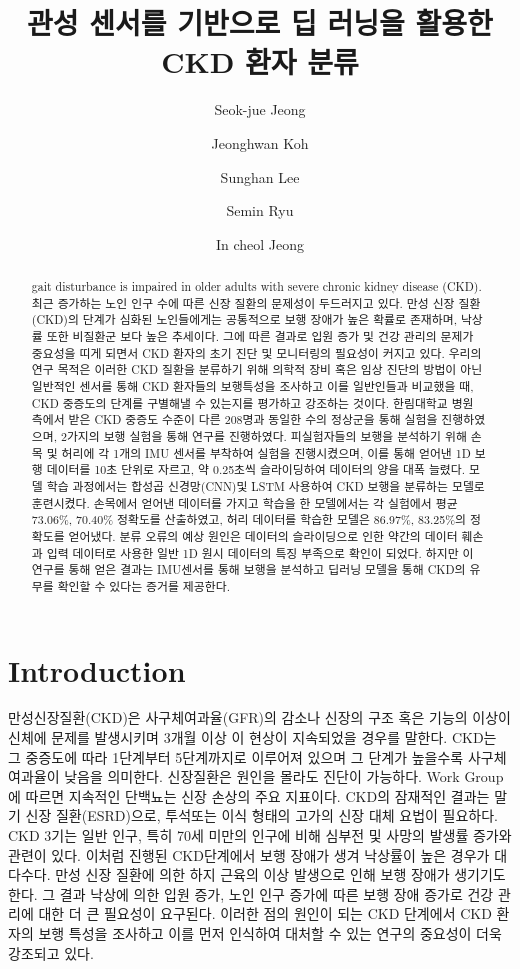 \documentclass{article}
\title{관성 센서를 기반으로 딥 러닝을 활용한 CKD 환자 분류}
\author[1,2]{Seok-jue Jeong}
\author[1,2]{Jeonghwan Koh}
\author[2]{Sunghan Lee}
\author[1,2]{Semin Ryu}
\author[1,2]{In cheol Jeong}
\affil[1]{Department of Artificial Intelligence Conversions, Hallym University, Chuncheon, Gangwon, Republic of Korea}
\affil[2]{Cerebrovascular Disease Research Center, Hallym University, Chuncheon, Gangwon, Republic of Korea}
\begin{document}
\maketitle

\begin{abstract}


gait disturbance is impaired in older adults with severe chronic kidney disease (CKD).
최근 증가하는 노인 인구 수에 따른 신장 질환의 문제성이 두드러지고 있다.
만성 신장 질환(CKD)의 단계가 심화된 노인들에게는 공통적으로 보행 장애가
높은 확률로 존재하며, 낙상률 또한 비질환군 보다 높은 추세이다. 그에 따른
결과로 입원 증가 및 건강 관리의 문제가 중요성을 띠게 되면서 CKD 환자의
초기 진단 및 모니터링의 필요성이 커지고 있다. 우리의 연구 목적은 이러한
CKD 질환을 분류하기 위해 의학적 장비 혹은 임상 진단의 방법이 아닌
일반적인 센서를 통해 CKD 환자들의 보행특성을 조사하고 이를 일반인들과
비교했을 때, CKD 중증도의 단계를 구별해낼 수 있는지를 평가하고 강조하는
것이다. 한림대학교 병원 측에서 받은 CKD 중증도 수준이 다른 208명과
동일한 수의 정상군을 통해 실험을 진행하였으며, 2가지의 보행 실험을 통해
연구를 진행하였다. 피실험자들의 보행을 분석하기 위해 손목 및 허리에 각
1개의 IMU 센서를 부착하여 실험을 진행시켰으며, 이를 통해 얻어낸 1D 보행
데이터를 10초 단위로 자르고, 약 0.25초씩 슬라이딩하여 데이터의 양을 대폭
늘렸다. 모델 학습 과정에서는 합성곱 신경망(CNN)및 LSTM 사용하여 CKD
보행을 분류하는 모델로 훈련시켰다. 손목에서 얻어낸 데이터를 가지고
학습을 한 모델에서는 각 실험에서 평균 73.06\%, 70.40\% 정확도를
산출하였고, 허리 데이터를 학습한 모델은 86.97\%, 83.25\%의 정확도를
얻어냈다. 분류 오류의 예상 원인은 데이터의 슬라이딩으로 인한 약간의
데이터 훼손과 입력 데이터로 사용한 일반 1D 원시 데이터의 특징 부족으로
확인이 되었다. 하지만 이 연구를 통해 얻은 결과는 IMU센서를 통해 보행을
분석하고 딥러닝 모델을 통해 CKD의 유무를 확인할 수 있다는 증거를 제공한다.
\end{abstract}

\section{Introduction}

만성신장질환(CKD)은 사구체여과율(GFR)의 감소나 신장의 구조 혹은 기능의
이상이 신체에 문제를 발생시키며 3개월 이상 이 현상이 지속되었을 경우를
말한다. \cite{inker_kdoqi_2014} CKD는 그 중증도에 따라 1단계부터 5단계까지로
이루어져 있으며 그 단계가 높을수록 사구체 여과율이 낮음을 의미한다.
\cite{levey_kdoqi_2002} 신장질환은 원인을 몰라도 진단이 가능하다. Work
Group에 따르면 지속적인 단백뇨는 신장 손상의 주요 지표이다.
\cite{keane_proteinuria_1999} CKD의 잠재적인 결과는 말기 신장 질환(ESRD)으로, 투석또는 이식 형태의 고가의 신장 대체 요법이 필요하다. \cite{zemp_gait_2019}
CKD 3기는 일반 인구, 특히 70세 미만의 인구에 비해 심부전 및 사망의
발생률 증가와 관련이 있다. \cite{eriksen_progression_2006} 이처럼 진행된 CKD단계에서
보행 장애가 생겨 낙상률이 높은 경우가 대다수다. 만성 신장 질환에 의한
하지 근육의 이상 발생으로 인해 보행 장애가 생기기도 한다.
\cite{bohannon_muscle_1994,gordon_association_2012} 그 결과 낙상에 의한 입원 증가, 노인 인구 증가에
따른 보행 장애 증가로 건강 관리에 대한 더 큰 필요성이 요구된다. 이러한
점의 원인이 되는 CKD 단계에서 CKD 환자의 보행 특성을 조사하고 이를 먼저
인식하여 대처할 수 있는 연구의 중요성이 더욱 강조되고 있다.
\end{document}
